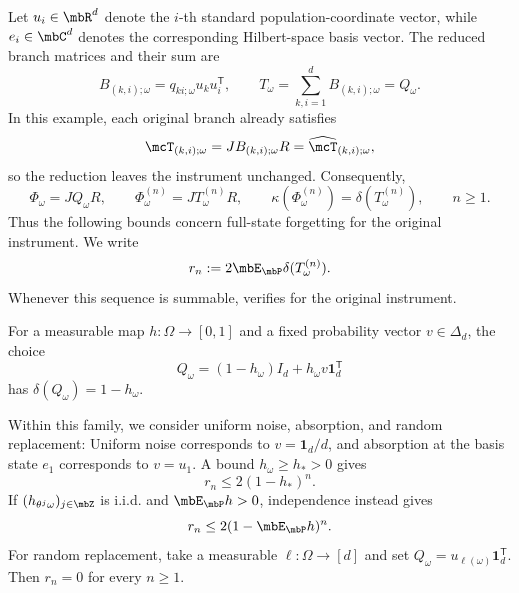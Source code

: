 \documentclass[a4paper]{article}
\numberwithin{equation}{section}   %
\theoremstyle{plain}   %
\theoremstyle{plain}   %
\theoremstyle{examplestyle}
\DeclareMathOperator{\pr}{\mbP}           %
\begin{document}
            Let $u_i\in\mbR^d$ denote the $i$-th standard population-coordinate vector, while $e_i\in\mbC^d$ denotes the corresponding Hilbert-space basis vector.
            The reduced branch matrices and their sum are
            \[
                 B_{(k,i);\omega}
                 =q_{ki;\omega}u_ku_i^{\mathsf T},
                 \qquad
                 T_\omega
                 =\sum_{k,i=1}^d B_{(k,i);\omega}
                 =Q_\omega.
            \]
            In this example, each original branch already satisfies
            \[
                 \mcT_{(k,i);\omega}
                 =JB_{(k,i);\omega}R
                 =\widehat{\mcT}_{(k,i);\omega},
            \]
            so the reduction leaves the instrument unchanged.
            Consequently,
            \[
                 \Phi_\omega=JQ_\omega R,
                 \qquad
                 \Phi_\omega^{(n)}=JT_\omega^{(n)}R,
                 \qquad
                 \kappa(\Phi_\omega^{(n)})
                 =\delta(T_\omega^{(n)}),
                 \qquad n\ge1.
            \]
            Thus the following bounds concern full-state forgetting for the original instrument.
            We write
            \[
                 r_n:=2\mbE_{\pr}\delta(T_\omega^{(n)}).
            \]
            Whenever this sequence is summable,  verifies  for the original instrument.
            
            For a measurable map $h:\Omega\to[0,1]$ and a fixed  probability vector $v\in\Delta_d$, the choice
            \[
                 Q_\omega=(1-h_\omega)I_d
                          +h_\omega v\mathbf1_d^{\mathsf T}
            \]
            has $\delta(Q_\omega)=1-h_\omega$.

            Within this family, we consider uniform noise, absorption, and random replacement:
            Uniform noise corresponds to $v=\mathbf1_d/d$, and absorption at the basis state $e_1$ corresponds to $v=u_1$.
            A bound $h_\omega\ge h_*>0$ gives
            \[
                r_n\le2(1-h_*)^n.
            \]
            If $(h_{\theta^j\omega})_{j\in\mbZ}$ is i.i.d.  and $\mbE_{\pr}h>0$, independence instead gives
            \[
             r_n\le2(1-\mbE_{\pr}h)^n.
            \]
            For random replacement, take a measurable $\ell:\Omega\to[d]$ and set \(Q_\omega=u_{\ell(\omega)}\mathbf1_d^{\mathsf T}\).
            Then $r_n=0$ for every $n\ge1$.
    
\end{document}
